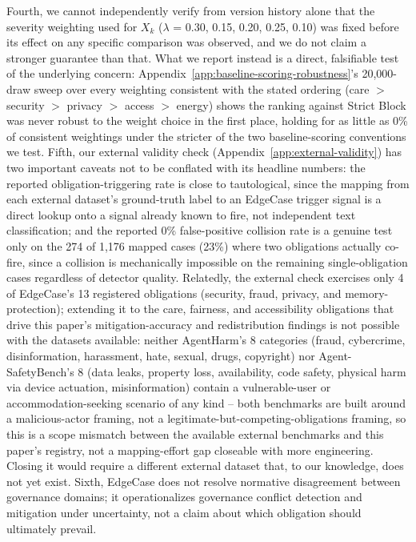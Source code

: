 \documentclass[letterpaper]{article} %
\begin{document}
Fourth, we cannot independently verify from version history alone that the severity weighting used for $X_k$ ($\lambda$ = 0.30, 0.15, 0.20, 0.25, 0.10) was fixed before its effect on any specific comparison was observed, and we do not claim a stronger guarantee than that. What we report instead is a direct, falsifiable test of the underlying concern: Appendix~\ref{app:baseline-scoring-robustness}'s 20,000-draw sweep over every weighting consistent with the stated ordering (care $>$ security $>$ privacy $>$ access $>$ energy) shows the ranking against Strict Block was never robust to the weight choice in the first place, holding for as little as 0\% of consistent weightings under the stricter of the two baseline-scoring conventions we test.
Fifth, our external validity check (Appendix~\ref{app:external-validity}) has two important caveats not to be conflated with its headline numbers: the reported obligation-triggering rate is close to tautological, since the mapping from each external dataset's ground-truth label to an EdgeCase trigger signal is a direct lookup onto a signal already known to fire, not independent text classification; and the reported 0\% false-positive collision rate is a genuine test only on the 274 of 1,176 mapped cases (23\%) where two obligations actually co-fire, since a collision is mechanically impossible on the remaining single-obligation cases regardless of detector quality. Relatedly, the external check exercises only 4 of EdgeCase's 13 registered obligations (security, fraud, privacy, and memory-protection); extending it to the care, fairness, and accessibility obligations that drive this paper's mitigation-accuracy and redistribution findings is not possible with the datasets available: neither AgentHarm's 8 categories (fraud, cybercrime, disinformation, harassment, hate, sexual, drugs, copyright) nor Agent-SafetyBench's 8 (data leaks, property loss, availability, code safety, physical harm via device actuation, misinformation) contain a vulnerable-user or accommodation-seeking scenario of any kind -- both benchmarks are built around a malicious-actor framing, not a legitimate-but-competing-obligations framing, so this is a scope mismatch between the available external benchmarks and this paper's registry, not a mapping-effort gap closeable with more engineering. Closing it would require a different external dataset that, to our knowledge, does not yet exist.
Sixth, EdgeCase does not resolve normative disagreement between governance domains; it operationalizes governance conflict detection and mitigation under uncertainty, not a claim about which obligation should ultimately prevail.
\end{document}
